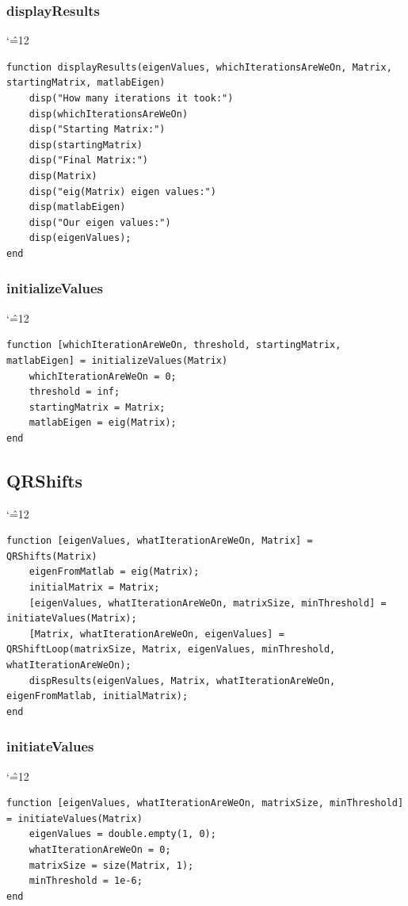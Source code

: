 \documentclass[12pt]{report}
\newenvironment{simplechar}{%
   \catcode`\^=12
}{}
\begin{document}
\subsubsection{displayResults}
\begin{simplechar}
\begin{lstlisting}
function displayResults(eigenValues, whichIterationsAreWeOn, Matrix, startingMatrix, matlabEigen)
    disp("How many iterations it took:")
    disp(whichIterationsAreWeOn)
    disp("Starting Matrix:")
    disp(startingMatrix)
    disp("Final Matrix:")
    disp(Matrix)
    disp("eig(Matrix) eigen values:")
    disp(matlabEigen)
    disp("Our eigen values:")
    disp(eigenValues);
end
\end{lstlisting}
\end{simplechar}

\subsubsection{initializeValues}
\begin{simplechar}
\begin{lstlisting}
function [whichIterationAreWeOn, threshold, startingMatrix, matlabEigen] = initializeValues(Matrix)
    whichIterationAreWeOn = 0;
    threshold = inf;
    startingMatrix = Matrix;
    matlabEigen = eig(Matrix);
end
\end{lstlisting}
\end{simplechar}

\subsection{QRShifts}
\begin{simplechar}
\begin{lstlisting}
function [eigenValues, whatIterationAreWeOn, Matrix] = QRShifts(Matrix)
    eigenFromMatlab = eig(Matrix);
    initialMatrix = Matrix;
    [eigenValues, whatIterationAreWeOn, matrixSize, minThreshold] = initiateValues(Matrix);
    [Matrix, whatIterationAreWeOn, eigenValues] = QRShiftLoop(matrixSize, Matrix, eigenValues, minThreshold, whatIterationAreWeOn);
    dispResults(eigenValues, Matrix, whatIterationAreWeOn, eigenFromMatlab, initialMatrix);
end
\end{lstlisting}
\end{simplechar}

\subsubsection{initiateValues}
\begin{simplechar}
\begin{lstlisting}
function [eigenValues, whatIterationAreWeOn, matrixSize, minThreshold] = initiateValues(Matrix)
    eigenValues = double.empty(1, 0);
    whatIterationAreWeOn = 0;
    matrixSize = size(Matrix, 1);
    minThreshold = 1e-6;
end

\end{lstlisting}
\end{simplechar}
\end{document}
